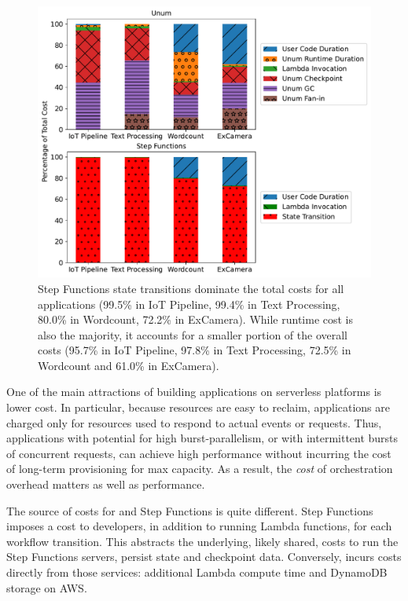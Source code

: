\begin{figure}[t!]
    \centering
    \includegraphics[width=\columnwidth]{figures/AppCostBreakdown.pdf}
    \caption{Step Functions state transitions dominate the total costs for all
    applications (99.5\% in IoT Pipeline, 99.4\% in Text Processing, 80.0\% in
    Wordcount, 72.2\% in ExCamera). While \name{} runtime cost is also the
    majority, it accounts for a smaller portion of the overall costs (95.7\%
    in IoT Pipeline, 97.8\% in Text Processing, 72.5\%
    in Wordcount and 61.0\% in ExCamera).}
    \label{fig:cost-breakdown}
\end{figure}

One of the main attractions of building applications on serverless platforms
is lower cost. In particular, because resources are easy to reclaim,
applications are charged only for resources used to respond to actual events
or requests. Thus, applications with potential for high burst-parallelism, or
with intermittent bursts of concurrent requests, can achieve high performance
without incurring the cost of long-term provisioning for max capacity. As a
result, the \emph{cost} of orchestration overhead matters as well as
performance.

The source of costs for \name{} and Step Functions is quite different. Step
Functions imposes a cost to developers, in addition to running Lambda
functions, for each workflow transition. This abstracts the underlying, likely
shared, costs to run the Step Functions servers, persist state and checkpoint
data. Conversely, \name{} incurs costs directly from those services:
additional Lambda compute time and DynamoDB storage on AWS.

